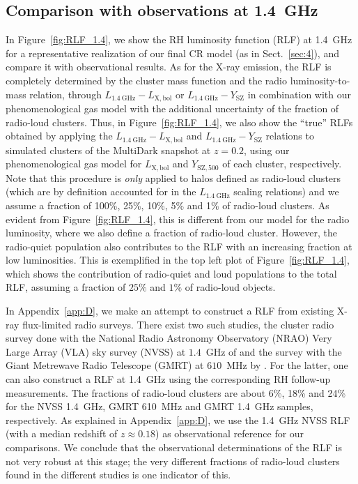 \documentclass[traditabstract]{aa}
\newcommand{\rmn}{\mathrm}
\begin{document}
\subsection{Comparison with observations at 1.4~GHz}

In Figure~\ref{fig:RLF_1.4}, we show the RH luminosity function (RLF) at 1.4~GHz
for a representative realization of our final CR model (as in
Sect.~\ref{sec:4}), and compare it with observational results. As for the X-ray
emission, the RLF is completely determined by the cluster mass function and the
radio luminosity-to-mass relation, through $L_{1.4~\rmn{GHz}}-L_{ \rmn{X,bol}}$
or $L_{1.4~\rmn{GHz}}-Y_{\rmn{SZ}}$ in combination with our phenomenological gas
model with the additional uncertainty of the fraction of radio-loud
clusters. Thus, in Figure~\ref{fig:RLF_1.4}, we also show the ``true'' RLFs
obtained by applying the $L_{1.4~\rmn{GHz}}-L_{\rmn{X,bol}}$ and
$L_{1.4~\rmn{GHz}}-Y_{\rmn{SZ}}$ relations to simulated clusters of the
MultiDark snapshot at $z = 0.2$, using our phenomenological gas model for
$L_{\rmn{X,bol}}$ and $Y_{\rmn{SZ}, 500}$ of each cluster, respectively. Note
that this procedure is {\em only} applied to halos defined as radio-loud
clusters (which are by definition accounted for in the $L_{1.4~\rmn{GHz}}$
scaling relations) and we assume a fraction of 100\%, 25\%, 10\%, 5\% and 1\% of
radio-loud clusters. As evident from Figure~\ref{fig:RLF_1.4}, this is different
from our model for the radio luminosity, where we also define a fraction of
radio-loud cluster. However, the radio-quiet population also contributes to the
RLF with an increasing fraction at low luminosities. This is exemplified in the
top left plot of Figure~\ref{fig:RLF_1.4}, which shows the contribution of
radio-quiet and loud populations to the total RLF, assuming a fraction of $25\%$
and $1\%$ of radio-loud objects.

In Appendix~\ref{app:D}, we make an attempt to construct a RLF from existing
X-ray flux-limited radio surveys. There exist two such studies, the cluster
radio survey done with the National Radio Astronomy Observatory (NRAO) Very
Large Array (VLA) sky survey (NVSS) at $1.4$~GHz of \cite{1999NewA....4..141G}
and the survey with the Giant Metrewave Radio Telescope (GMRT) at $610$~MHz by
\cite{VenturiGMRT_1,VenturiGMRT_2}. For the latter, one can also construct a RLF
at 1.4~GHz using the corresponding RH follow-up measurements. The fractions of
radio-loud clusters are about 6\%, 18\% and 24\% for the NVSS 1.4~GHz, GMRT
610~MHz and GMRT 1.4~GHz samples, respectively. As explained in
Appendix~\ref{app:D}, we use the 1.4~GHz NVSS RLF (with a median redshift of $z
\approx 0.18$) as observational reference for our comparisons. We conclude that
the observational determinations of the RLF is not very robust at this stage;
the very different fractions of radio-loud clusters found in the different
studies is one indicator of this.
 
\end{document}
